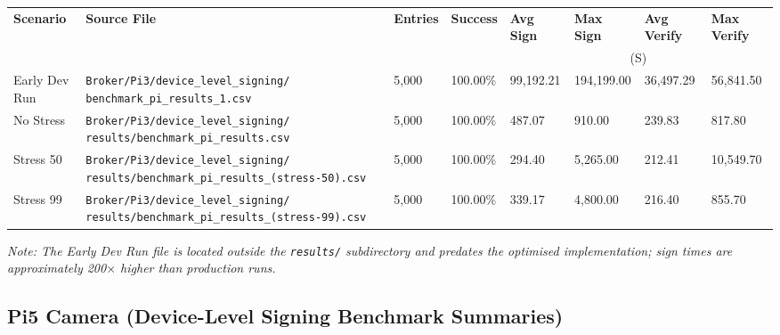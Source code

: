 \documentclass[11pt,letterpaper]{article}
\newcommand{\us}{\textmu{}S}   %
\newcommand{\code}[1]{\texttt{#1}}
\begin{document}
\begin{adjustbox}{max width=\linewidth}
\begin{tabular}{@{}L{3cm}L{8.5cm}R{1.6cm}R{1.8cm}R{1.8cm}R{1.8cm}R{1.8cm}R{1.8cm}@{}}
\toprule
\textbf{Scenario} & \textbf{Source File} & \textbf{Entries} & \textbf{Success} &
\textbf{Avg Sign} & \textbf{Max Sign} & \textbf{Avg Verify} & \textbf{Max Verify} \\
 & & & & \multicolumn{4}{c}{(\us)} \\
\midrule
Early Dev Run &
  \code{Broker/Pi3/device\_level\_signing/} \code{benchmark\_pi\_results\_1.csv} &
  5,000 & 100.00\% & 99,192.21 & 194,199.00 & 36,497.29 & 56,841.50 \\
No Stress &
  \code{Broker/Pi3/device\_level\_signing/} \code{results/benchmark\_pi\_results.csv} &
  5,000 & 100.00\% & 487.07 & 910.00 & 239.83 & 817.80 \\
Stress 50 &
  \code{Broker/Pi3/device\_level\_signing/} \code{results/benchmark\_pi\_results\_(stress-50).csv} &
  5,000 & 100.00\% & 294.40 & 5,265.00 & 212.41 & 10,549.70 \\
Stress 99 &
  \code{Broker/Pi3/device\_level\_signing/} \code{results/benchmark\_pi\_results\_(stress-99).csv} &
  5,000 & 100.00\% & 339.17 & 4,800.00 & 216.40 & 855.70 \\
\bottomrule
\end{tabular}
\end{adjustbox}

\textit{Note: The Early Dev Run file is located outside the \code{results/} subdirectory and predates
the optimised implementation; sign times are approximately 200$\times$ higher than production runs.}

\subsection{Pi5 Camera (Device-Level Signing Benchmark Summaries)}
\end{document}

